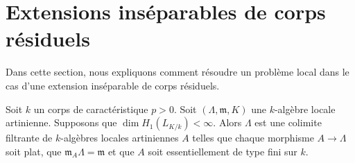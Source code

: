 \section{Extensions inséparables de corps résiduels}
\label{section-inseparable}

\noindent
Dans cette section, nous expliquons comment résoudre un problème local dans le cas
d'une extension inséparable de corps résiduels.

\begin{lemma}
\label{lemma-helper}
Soit $k$ un corps de caractéristique $p > 0$.
Soit $(\Lambda, \mathfrak m, K)$ une $k$-algèbre locale artinienne.
Supposons que $\dim H_1(L_{K/k}) < \infty$.
Alors $\Lambda$ est une colimite filtrante de $k$-algèbres
locales artiniennes $A$ telles que chaque morphisme $A \to \Lambda$ soit plat, que
$\mathfrak m_A \Lambda = \mathfrak m$ et que
$A$ soit essentiellement de type fini sur $k$.
\end{lemma}

